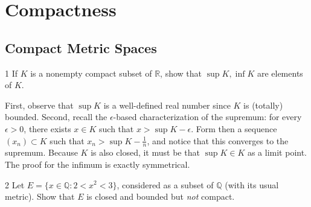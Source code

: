 \chapter{Compactness}

\section{Compact Metric Spaces}

\begin{exercise}{1}
    If $K$ is a nonempty compact subset of $\mathbb{R}$, show that $\sup K, \inf K$ are elements of $K$.
\end{exercise}

\begin{solution}
    
    First, observe that $\sup K$ is a well-defined real number since $K$ is (totally) bounded.
    Second, recall the $\epsilon$-based characterization of the supremum: for every $\epsilon > 0$, there exists $x \in K$ such that $x > \sup K - \epsilon$.    
    Form then a sequence $(x_n) \subset K$ such that $x_n > \sup K - \frac{1}{n}$, and notice that this converges to the supremum.
    Because $K$ is also closed, it must be that $\sup K \in K$ as a limit point.
    The proof for the infimum is exactly symmetrical.
\end{solution}

\begin{exercise}{2}
    Let $E = \{x \in \mathbb{Q} : 2 < x^2 < 3 \}$, considered as a subset of $\mathbb{Q}$ (with its usual metric).
    Show that $E$ is closed and bounded but \textit{not} compact.
\end{exercise}

